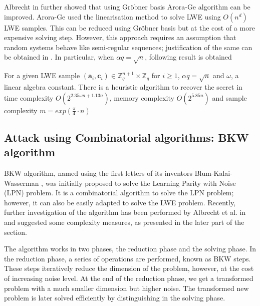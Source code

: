 Albrecht in \cite{albrecht2014algebraic} further showed that using Gr\"{o}bner basis Arora-Ge algorithm can be improved. Arora-Ge used the linearisation method to solve LWE using $O(n^d)$ LWE samples. This can be reduced using Gr\"{o}bner basis but at the cost of a more expensive solving step. However, this approach requires an assumption that random systems behave like semi-regular sequences; justification of the same can be obtained in \cite{albrecht2014algebraic}. In particular, when $\alpha q=\sqrt{n}$, following result is obtained

\begin{theorem}
    For a given LWE sample $(\textbf{a}_i, \textbf{c}_i) \in \mathbb{Z}^{n+1}_q \times \mathbb{Z}_q$ for $i\geq1$, $\alpha q =\sqrt{n}$ and $\omega$, a linear algebra constant. There is a heuristic algorithm to recover the secret in time complexity $O(2^{2.35\omega n+1.13n})$, memory complexity $O(2^{5.85n})$ and sample complexity $m=exp(\frac{\pi}{4}\cdot n)$
\end{theorem}



\subsection{Attack using Combinatorial algorithms: BKW algorithm}
BKW algorithm, named using the first letters of its inventors Blum-Kalai-Wasserman \cite{blum2003noise}, was initially proposed to solve the Learning Parity with Noise (LPN) problem. It is a combinatorial algorithm to solve the LPN problem; however, it can also be easily adapted to solve the LWE problem. Recently, further investigation of the algorithm has been performed by Albrecht et al. in \cite{albrecht2014algebraic} and suggested some complexity measures, as presented in the later part of the section.

The algorithm works in two phases, the reduction phase and the solving phase. In the reduction phase, a series of operations are performed, known as BKW steps. These steps iteratively reduce the dimension of the problem, however, at the cost of increasing noise level. At the end of the reduction phase, we get a transformed problem with a much smaller dimension but higher noise. The transformed new problem is later solved efficiently by distinguishing in the solving phase.

